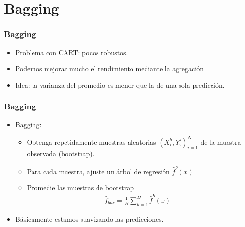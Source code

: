 \documentclass[
  shownotes,
  xcolor={svgnames},
  hyperref={colorlinks,citecolor=DarkBlue,linkcolor=andesred,urlcolor=DarkBlue}
  , aspectratio=169]{beamer}
\begin{document}
\section{Bagging }
\begin{frame}[fragile]
\frametitle{Bagging}

\begin{itemize}
  \item Problema con CART: pocos robustos.
  \medskip
   \item Podemos mejorar mucho el rendimiento mediante la agregación 
   \medskip
     \item Idea: la varianza del promedio es menor que la de una sola predicción.
\end{itemize}

\end{frame}


\begin{frame}[fragile]
\frametitle{Bagging}
\begin{itemize}
   \item Bagging:
    \begin{itemize}
       \item Obtenga repetidamente muestras aleatorias $(X_i^b,Y_i^b)_{i=1}^N$ de la muestra observada (bootstrap).
       \medskip
       \item Para cada muestra, ajuste un árbol de regresión $\hat{f}^b(x)$
       \medskip
       \item Promedie las muestras de bootstrap 
        \begin{align}
         \hat{f}_{bag} =\frac{1}{B}\sum_{b=1}^B \hat{f}^b(x)
        \end{align}
      \end{itemize}
  \item Básicamente estamos suavizando las predicciones.

  \end{itemize}

\end{frame}
\end{document}
